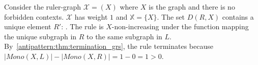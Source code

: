 \begin{example}
      Consider the ruler-graph $\mathcal{X} = (X)$ where $X$ is the graph
       and there is no forbidden contexts. $\mathcal{X}$ has weight $1$ and $\mathbb{X} = \{X\}$.
      The set \( D(R,X) \) contains a unique element $R'$:
      . The rule is $X$-non-increasing under the function mapping the unique subgraph in $R$ to the same subgraph in $L$. 
      By~\autoref{antipattern:thm:termination_grs}, the rule terminates because \(|Mono(X,L)| - |Mono(X,R)| = 1 - 0 = 1 > 0 \). 
\end{example}
